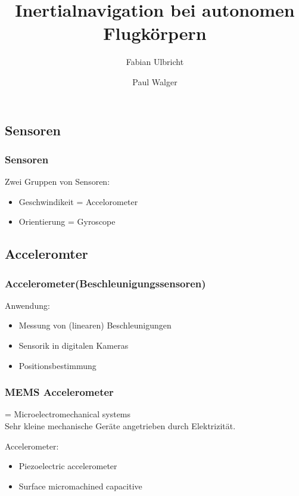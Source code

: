 \documentclass[10pt,a4paper,oneside]{beamer}
\title{Inertialnavigation bei autonomen Flugkörpern}
\author{
	Fabian Ulbricht \and
	Paul Walger 
}
\begin{document}
\frame{
	\titlepage
}

\begin{frame}
	\section{Sensoren}
	\frametitle{Sensoren}
	Zwei Gruppen von Sensoren:
	\begin{itemize}
		\item Geschwindikeit = Accelorometer
		\item Orientierung = Gyroscope
	\end{itemize}

\end{frame}

\begin{frame}
  \subsection{Acceleromter}
  \frametitle{Accelerometer(Beschleunigungssensoren)}
  
  Anwendung:
  \begin{itemize}
    \item Messung von (linearen) Beschleunigungen
  	\item Sensorik in digitalen Kameras
  	\item Positionsbestimmung
  \end{itemize}
\end{frame}

\begin{frame}
  \frametitle{MEMS Accelerometer}
  
  \begin{definition}[MEMS]
  = Microelectromechanical systems \\
  Sehr kleine mechanische Geräte angetrieben durch Elektrizität.
  \end{definition}
  \medskip 
  Accelerometer:
  \begin{itemize}
    \item Piezoelectric accelerometer
  	\item Surface micromachined capacitive
  \end{itemize}
\end{frame}
\end{document}
